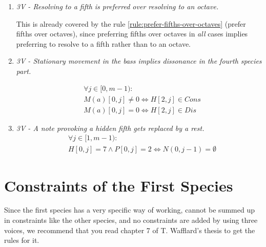 \begin{enumerate}[wide, label=\bfseries 4.P\arabic*]
    \item \textit{3V - Resolving to a fifth is preferred over resolving to an octave.}    
    
    This is already covered by the rule \ref{rule:prefer-fifths-over-octaves} (prefer fifths over octaves), since preferring fifths over octaves in \textit{all} cases implies preferring to resolve to a fifth rather than to an octave.

    \item \textit{3V - Stationary movement in the bass implies dissonance in the fourth species part.}

    \begin{equation}
        \begin{aligned}
        &\forall j \in [0, m-1):\\
        &M(a)[0, j] \neq 0 \iff H[2, j] \in Cons\\
        &M(a)[0, j] = 0 \iff H[2, j] \in Dis
        \end{aligned}
    \end{equation}        


    \item \textit{3V - A note provoking a hidden fifth gets replaced by a rest.}
    \begin{equation}
        \begin{aligned}
            &\forall j \in [1, m-1):\\
            &H[0, j] = 7 \land P[0,j] = 2 \iff N(0, j-1) = \emptyset  
        \end{aligned}
    \end{equation}

\end{enumerate}
\section*{Constraints of the First Species}
Since the first species has a very specific way of working, cannot be summed up in constraints like the other species, and no constraints are added by using three voices, we recommend that you read chapter 7 of T. Wafflard's thesis to get the rules for it.